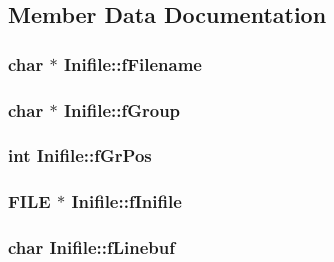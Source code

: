 \subsection{Member Data Documentation}
\hypertarget{classInifile_af0e8b673a17778eb70b22e35a6b328d2}{
\subsubsection[{f\-Filename}]{\setlength{\rightskip}{0pt plus 5cm}char $\ast$ Inifile\-::f\-Filename\hspace{0.3cm}{\ttfamily [protected]}}}\label{classInifile_af0e8b673a17778eb70b22e35a6b328d2}
\hypertarget{classInifile_a7a256617578ef60fde020cff47974cf6}{
\subsubsection[{f\-Group}]{\setlength{\rightskip}{0pt plus 5cm}char $\ast$ Inifile\-::f\-Group\hspace{0.3cm}{\ttfamily [protected]}}}\label{classInifile_a7a256617578ef60fde020cff47974cf6}
\hypertarget{classInifile_a534bb73b81dea9c6d4c540d6f666c8fc}{
\subsubsection[{f\-Gr\-Pos}]{\setlength{\rightskip}{0pt plus 5cm}int Inifile\-::f\-Gr\-Pos\hspace{0.3cm}{\ttfamily [protected]}}}\label{classInifile_a534bb73b81dea9c6d4c540d6f666c8fc}
\hypertarget{classInifile_ae0124995e028778d1de49eee5cc5eca2}{
\subsubsection[{f\-Inifile}]{\setlength{\rightskip}{0pt plus 5cm}F\-I\-L\-E $\ast$ Inifile\-::f\-Inifile\hspace{0.3cm}{\ttfamily [protected]}}}\label{classInifile_ae0124995e028778d1de49eee5cc5eca2}
\hypertarget{classInifile_a2be8f61e323dc6a9677952e2bf2e3815}{
\subsubsection[{f\-Linebuf}]{\setlength{\rightskip}{0pt plus 5cm}char Inifile\-::f\-Linebuf\hspace{0.3cm}{\ttfamily [protected]}}}\label{classInifile_a2be8f61e323dc6a9677952e2bf2e3815}

